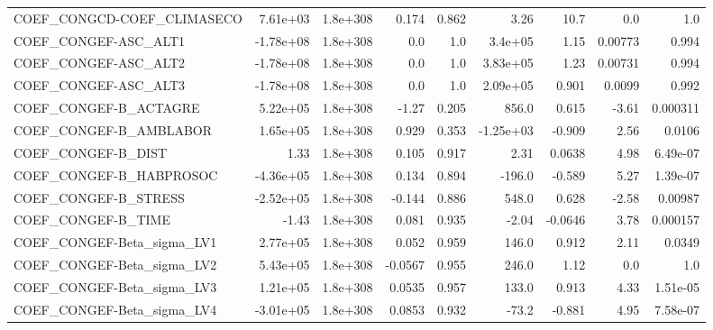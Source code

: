\begin{tabular}{lrrrrrrrr}
COEF\_CONGCD-COEF\_CLIMASECO        &    7.61e+03 &     1.8e+308 &   0.174 &    0.862 &       3.26 &        10.7 &          0.0 &           1.0 \\
COEF\_CONGEF-ASC\_ALT1              &   -1.78e+08 &     1.8e+308 &     0.0 &      1.0 &    3.4e+05 &        1.15 &      0.00773 &         0.994 \\
COEF\_CONGEF-ASC\_ALT2              &   -1.78e+08 &     1.8e+308 &     0.0 &      1.0 &   3.83e+05 &        1.23 &      0.00731 &         0.994 \\
COEF\_CONGEF-ASC\_ALT3              &   -1.78e+08 &     1.8e+308 &     0.0 &      1.0 &   2.09e+05 &       0.901 &       0.0099 &         0.992 \\
COEF\_CONGEF-B\_ACTAGRE             &    5.22e+05 &     1.8e+308 &   -1.27 &    0.205 &      856.0 &       0.615 &        -3.61 &      0.000311 \\
COEF\_CONGEF-B\_AMBLABOR            &    1.65e+05 &     1.8e+308 &   0.929 &    0.353 &  -1.25e+03 &      -0.909 &         2.56 &        0.0106 \\
COEF\_CONGEF-B\_DIST                &        1.33 &     1.8e+308 &   0.105 &    0.917 &       2.31 &      0.0638 &         4.98 &      6.49e-07 \\
COEF\_CONGEF-B\_HABPROSOC           &   -4.36e+05 &     1.8e+308 &   0.134 &    0.894 &     -196.0 &      -0.589 &         5.27 &      1.39e-07 \\
COEF\_CONGEF-B\_STRESS              &   -2.52e+05 &     1.8e+308 &  -0.144 &    0.886 &      548.0 &       0.628 &        -2.58 &       0.00987 \\
COEF\_CONGEF-B\_TIME                &       -1.43 &     1.8e+308 &   0.081 &    0.935 &      -2.04 &     -0.0646 &         3.78 &      0.000157 \\
COEF\_CONGEF-Beta\_sigma\_LV1        &    2.77e+05 &     1.8e+308 &   0.052 &    0.959 &      146.0 &       0.912 &         2.11 &        0.0349 \\
COEF\_CONGEF-Beta\_sigma\_LV2        &    5.43e+05 &     1.8e+308 & -0.0567 &    0.955 &      246.0 &        1.12 &          0.0 &           1.0 \\
COEF\_CONGEF-Beta\_sigma\_LV3        &    1.21e+05 &     1.8e+308 &  0.0535 &    0.957 &      133.0 &       0.913 &         4.33 &      1.51e-05 \\
COEF\_CONGEF-Beta\_sigma\_LV4        &   -3.01e+05 &     1.8e+308 &  0.0853 &    0.932 &      -73.2 &      -0.881 &         4.95 &      7.58e-07 \\

\end{tabular}
